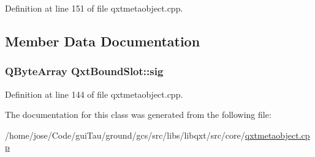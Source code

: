 Definition at line 151 of file qxtmetaobject.\-cpp.



\subsection{Member Data Documentation}
\hypertarget{class_qxt_bound_slot_a9a63bb5358f695ba950a35ce67464016}{
\subsubsection[{sig}]{\setlength{\rightskip}{0pt plus 5cm}Q\-Byte\-Array Qxt\-Bound\-Slot\-::sig}}\label{class_qxt_bound_slot_a9a63bb5358f695ba950a35ce67464016}


Definition at line 144 of file qxtmetaobject.\-cpp.



The documentation for this class was generated from the following file\-:\begin{DoxyCompactItemize}
\item 
/home/jose/\-Code/gui\-Tau/ground/gcs/src/libs/libqxt/src/core/\hyperlink{qxtmetaobject_8cpp}{qxtmetaobject.\-cpp}\end{DoxyCompactItemize}
